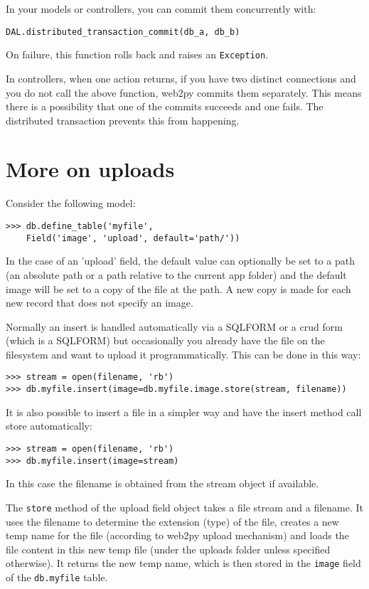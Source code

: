 \documentclass[justified,sixbynine,notoc]{tufte-book}
\def\ft{\small\tt}
\begin{document}
\begin{fullwidth}
In your models or controllers, you can commit them concurrently with:
\begin{lstlisting}
DAL.distributed_transaction_commit(db_a, db_b)
\end{lstlisting}

On failure, this function rolls back and raises an {\ft Exception}.

In controllers, when one action returns, if you have two distinct connections and you do not call the above function, web2py commits them separately. This means there is a possibility that one of the commits succeeds and one fails. The distributed transaction prevents this from happening.

\goodbreak\section{More on uploads}

Consider the following model:
\begin{lstlisting}
>>> db.define_table('myfile',
    Field('image', 'upload', default='path/'))
\end{lstlisting}

In the case of an 'upload' field, the default value can optionally be set to a path (an absolute path or a path relative to the current app folder) and the default image will be set to a copy of the file at the path. A new copy is made for each new record that does not specify an image.

Normally an insert is handled automatically via a SQLFORM or a crud form (which is a SQLFORM) but occasionally you already have the file on the filesystem and want to upload it programmatically. This can be done in this way:
\begin{lstlisting}
>>> stream = open(filename, 'rb')
>>> db.myfile.insert(image=db.myfile.image.store(stream, filename))
\end{lstlisting}

It is also possible to insert a file in a simpler way and have the insert method call store automatically:

\begin{lstlisting}
>>> stream = open(filename, 'rb')
>>> db.myfile.insert(image=stream)
\end{lstlisting}

In this case the filename is obtained from the stream object if available.

The {\ft store} method of the upload field object takes a file stream and a filename. It uses the filename to determine the extension (type) of the file, creates a new temp name for the file (according to web2py upload mechanism) and loads the file content in this new temp file (under the uploads folder unless specified otherwise). It returns the new temp name, which is then stored in the {\ft image} field of the {\ft db.myfile} table.


\end{fullwidth}
\end{document}

